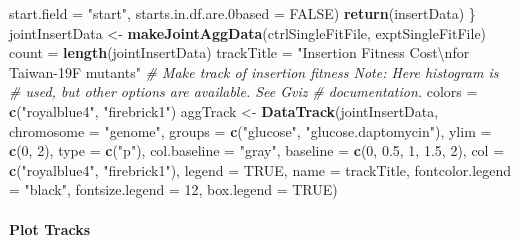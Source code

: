 \documentclass[11pt,]{article}
\newenvironment{Shaded}{\begin{snugshade}}{\end{snugshade}}
\newcommand{\KeywordTok}[1]{\textcolor[rgb]{0.13,0.29,0.53}{\textbf{{#1}}}}
\newcommand{\DataTypeTok}[1]{\textcolor[rgb]{0.13,0.29,0.53}{{#1}}}
\newcommand{\DecValTok}[1]{\textcolor[rgb]{0.00,0.00,0.81}{{#1}}}
\newcommand{\FloatTok}[1]{\textcolor[rgb]{0.00,0.00,0.81}{{#1}}}
\newcommand{\CharTok}[1]{\textcolor[rgb]{0.31,0.60,0.02}{{#1}}}
\newcommand{\StringTok}[1]{\textcolor[rgb]{0.31,0.60,0.02}{{#1}}}
\newcommand{\CommentTok}[1]{\textcolor[rgb]{0.56,0.35,0.01}{\textit{{#1}}}}
\newcommand{\OtherTok}[1]{\textcolor[rgb]{0.56,0.35,0.01}{{#1}}}
\newcommand{\NormalTok}[1]{{#1}}
\let\oldparagraph\paragraph
\renewcommand{\paragraph}[1]{\oldparagraph{#1}\mbox{}}
\begin{document}
\begin{Shaded}
\begin{Highlighting}[]
        \DataTypeTok{start.field =} \StringTok{"start"}\NormalTok{, }\DataTypeTok{starts.in.df.are.0based =} \OtherTok{FALSE}\NormalTok{)}
    \KeywordTok{return}\NormalTok{(insertData)}
\NormalTok{\}}
\NormalTok{jointInsertData <-}\StringTok{ }\KeywordTok{makeJointAggData}\NormalTok{(ctrlSingleFitFile, exptSingleFitFile)}
\NormalTok{count =}\StringTok{ }\KeywordTok{length}\NormalTok{(jointInsertData)}
\NormalTok{trackTitle =}\StringTok{ "Insertion Fitness Cost}\CharTok{\textbackslash{}n}\StringTok{for Taiwan-19F mutants"}
\CommentTok{# Make track of insertion fitness Note: Here histogram is}
\CommentTok{# used, but other options are available. See Gviz}
\CommentTok{# documentation.}
\NormalTok{colors =}\StringTok{ }\KeywordTok{c}\NormalTok{(}\StringTok{"royalblue4"}\NormalTok{, }\StringTok{"firebrick1"}\NormalTok{)}
\NormalTok{aggTrack <-}\StringTok{ }\KeywordTok{DataTrack}\NormalTok{(jointInsertData, }\DataTypeTok{chromosome =} \StringTok{"genome"}\NormalTok{, }
    \DataTypeTok{groups =} \KeywordTok{c}\NormalTok{(}\StringTok{"glucose"}\NormalTok{, }\StringTok{"glucose.daptomycin"}\NormalTok{), }\DataTypeTok{ylim =} \KeywordTok{c}\NormalTok{(}\DecValTok{0}\NormalTok{, }
        \DecValTok{2}\NormalTok{), }\DataTypeTok{type =} \KeywordTok{c}\NormalTok{(}\StringTok{"p"}\NormalTok{), }\DataTypeTok{col.baseline =} \StringTok{"gray"}\NormalTok{, }\DataTypeTok{baseline =} \KeywordTok{c}\NormalTok{(}\DecValTok{0}\NormalTok{, }
        \FloatTok{0.5}\NormalTok{, }\DecValTok{1}\NormalTok{, }\FloatTok{1.5}\NormalTok{, }\DecValTok{2}\NormalTok{), }\DataTypeTok{col =} \KeywordTok{c}\NormalTok{(}\StringTok{"royalblue4"}\NormalTok{, }\StringTok{"firebrick1"}\NormalTok{), }
    \DataTypeTok{legend =} \OtherTok{TRUE}\NormalTok{, }\DataTypeTok{name =} \NormalTok{trackTitle, }\DataTypeTok{fontcolor.legend =} \StringTok{"black"}\NormalTok{, }
    \DataTypeTok{fontsize.legend =} \DecValTok{12}\NormalTok{, }\DataTypeTok{box.legend =} \OtherTok{TRUE}\NormalTok{)}
\end{Highlighting}
\end{Shaded}

\paragraph{Plot Tracks}\label{plot-tracks}
\end{document}
